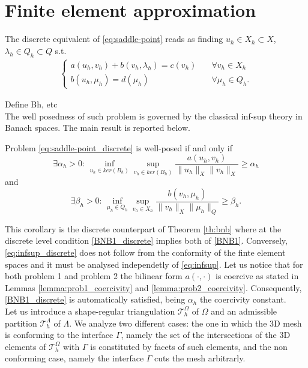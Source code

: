\section{Finite element approximation}
The discrete equivalent of \eqref{eq:saddle-point} reads as finding $u_h\in X_h\subset X$, $\lambda_h\in Q_h\subset Q$ s.t.
\begin{eqnarray}\label{eq:saddle-point_discrete}
\begin{cases}
a(u_h,v_h)+b(v_h,\lambda_h)=c(v_h)\quad &\forall v_h\in X_h\\
b(u_h,\mu_h)=d(\mu_h) \quad &\forall \mu_h\in Q_h.
\end{cases}
\end{eqnarray}

{\color{red} Define Bh, etc}\\
The well posedness of such problem is governed by the classical inf-sup theory in Banach spaces. The main result is reported below.

\begin{corollary}{\cite[Theorem 2.42]{MR2050138}}
Problem \eqref{eq:saddle-point_discrete} is well-posed if and only if 
\begin{equation}\label{BNB1_discrete}
\exists \alpha_h >0 :\, \inf_{u_h\in ker(B_h)}\sup_{v_h\in ker(B_h)} \frac{a(u_h,v_h)}{\|u_h\|_{X}\|v_h\|_{X}}\geq \alpha_h
\end{equation}
and 
\begin{equation}\label{eq:infsup_discrete}
\exists \beta_h >0:\,\inf_{\mu_h\in Q_h}\sup_{v_h\in X_h} \frac{b(v_h,\mu_h)}{\|v_h\|_{X}\|\mu_h\|_{Q}}\geq \beta_h .
\end{equation}
\end{corollary}
This corollary is the discrete counterpart of Theorem \ref{th:bnb} where at the discrete level condition \eqref{BNB1_discrete} implies both of \eqref{BNB1}. Conversely, \eqref{eq:infsup_discrete} does not follow from the conformity of the finte element spaces and it must be analysed independetly of \eqref{eq:infsup}.  
Let us notice that for both problem 1 and problem 2 the bilinear form $a(\cdot, \cdot)$ is coercive as stated in Lemmas \eqref{lemma:prob1_coercivity} and \eqref{lemma:prob2_coercivity}. Consequently, \eqref{BNB1_discrete} is automatically satisfied, being $\alpha_h$ the coercivity constant.\\

Let us introduce a shape-regular triangulation $\mathcal{T}^{\Omega}_h$ of $\Omega$ and an admissible partition $\mathcal{T}^{\Lambda}_{h}$ of $\Lambda$. 
We analyze two different cases: the one in which the 3D mesh is conforming to the interface $\Gamma$, namely the set of the intersections of the 3D elements of $\mathcal{T}^{\Omega}_h$ with $\Gamma$ is constituted by facets of such elements, and the non conforming case, namely the interface $\Gamma$ cuts the mesh arbitrarly.

